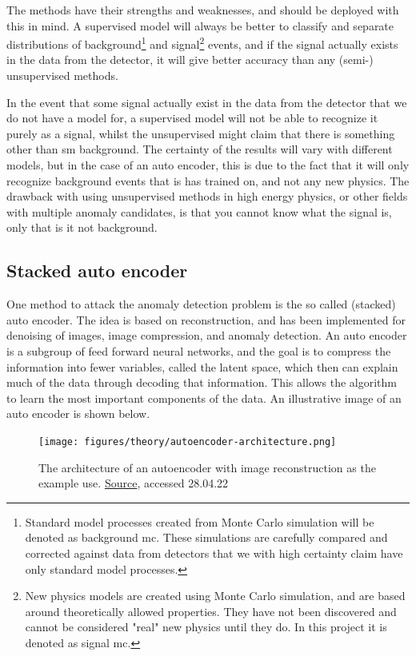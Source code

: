 \documentclass[ reprint, amsmath,amssymb, aps, nofootinbib]{revtex4-2}
\begin{document}
The methods have their strengths and weaknesses, and should be deployed with this in mind. A supervised model will always be better to classify and separate distributions of background\footnote{Standard model processes created from Monte Carlo simulation will be denoted as background mc. These simulations are carefully compared and corrected against data from detectors that we with high certainty claim have only standard model processes.} and signal\footnote{New physics models are created using Monte Carlo simulation, and are based around theoretically allowed properties. They have not been discovered and cannot be considered "real" new physics until they do. In this project it is denoted as signal mc.} events, and if the signal actually exists in the data from the detector, it will give better accuracy than any (semi-) unsupervised methods. \par 
In the event that some signal actually exist in the data from the detector that we do not have a model for, a supervised model will not be able to recognize it purely as a signal, whilst the unsupervised might claim that there is something other than sm background. The certainty of the results will vary with different models, but in the case of an auto encoder, this is due to the fact that it will only recognize background events that is has trained on, and not any new physics. The drawback with using unsupervised methods in high energy physics, or other fields with multiple anomaly candidates, is that you cannot know what the signal is, only that is it not background. \par 



\subsection{Stacked auto encoder}
One method to attack the anomaly detection problem is the so called (stacked) auto encoder. The idea is based on reconstruction, and has been implemented for denoising of images, image compression, and anomaly detection. An auto encoder is a subgroup of feed forward neural networks\cite{FYSSTK}, and the goal is to compress the information into fewer variables, called the latent space, which then can explain much of the data through decoding that information. This allows the algorithm to learn the most important components of the data. An illustrative image of an auto encoder is shown below. 

\begin{figure}[H]
    \centering
    \texttt{[image: figures/theory/autoencoder-architecture.png]}
    \caption{The architecture of an autoencoder with image reconstruction as the example use. \href{https://lilianweng.github.io/posts/2018-08-12-vae/}{Source}, accessed 28.04.22}
    \label{fig:auto_en_archi}
\end{figure}
\end{document}
